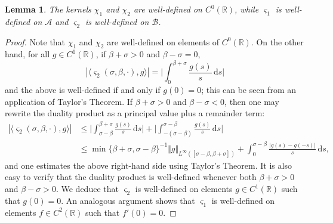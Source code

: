\documentclass[11pt,a4paper,reqno]{amsart}
\numberwithin{equation}{section}
\newtheorem{lemma}{Lemma}[section]
\theoremstyle{definition}
\theoremstyle{remark}
\renewcommand{\d}{\, \mathrm{d}}
\renewcommand{\leq}{\leqslant}
\begin{document}
{\begin{lemma}\label{lem:admissibility kernels}
    The kernels $\chi_1$ and $\chi_2$ are well-defined on $C^0(\mathbb{R})$, while $\varsigma_1$ is well-defined on $\mathcal{A}$ and $\varsigma_2$ is well-defined on 
    $\mathcal{B}$. 
\end{lemma}




\begin{proof}
Note that $\chi_1$ and $\chi_2$ are well-defined on elements of $C^0(\mathbb{R})$. On the other hand, for all $g \in C^1(\mathbb{R})$, if $\beta+\sigma>0$ and $\beta-\sigma=0$, 
\begin{equation*}
    |\langle \varsigma_2(\sigma,\beta,\cdot), g \rangle| = \bigg|\int^{\beta+\sigma}_{0} \frac{g(s)}{s} \d s \bigg| 
\end{equation*}
and the above is well-defined if and only if $g(0)=0$; this can be seen from an application of Taylor's Theorem. If $\beta+\sigma>0$ and $\beta-\sigma<0$, then one may rewrite the duality product as a principal value plus a remainder term: 
\begin{equation*}
    \begin{aligned}
        |\langle \varsigma_2(\sigma,\beta,\cdot), g \rangle| &\leq \bigg|\int^{\beta+\sigma}_{\sigma-\beta} \frac{g(s)}{s} \d s \bigg| + \bigg|\int^{\sigma-\beta}_{-(\sigma-\beta)} \frac{g(s)}{s} \d s \bigg| \\ 
        &\leq \min\{\beta+\sigma,\sigma-\beta\}^{-1} \Vert g \Vert_{L^\infty([\sigma-\beta,\beta+\sigma])} + \int^{\sigma-\beta}_{0} \frac{|g(s)-g(-s)|}{s} \d s, 
    \end{aligned}
\end{equation*}
and one estimates the above right-hand side using Taylor's Theorem. It is also easy to verify that the duality product is well-defined whenever both $\beta+\sigma > 0$ and $\beta-\sigma>0$. We deduce that $\varsigma_2$ is well-defined on elements $g \in C^1(\mathbb{R})$ such that $g(0) = 0$. An analogous argument shows that $\varsigma_1$ is well-defined on elements $f \in C^2(\mathbb{R})$ such that $f'(0)=0$. 
\end{proof}


}
\end{document}
